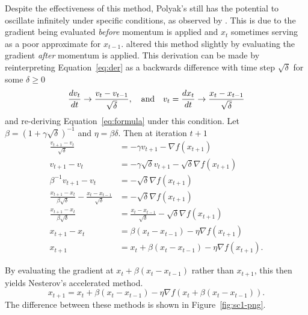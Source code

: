 Despite the effectiveness of this method, Polyak's still has the potential to
oscillate infinitely under specific conditions, as observed by
\citeauthor{lessard2016analysis}. This is due to the gradient being evaluated
\emph{before} momentum is applied and $x_t$ sometimes serving as a poor approximate
for $x_{t - 1}$. \citeauthor{nesterov1983method} altered this method slightly by
evaluating the gradient \emph{after} momentum is applied.  This derivation can
be made by reinterpreting Equation~\ref{eq:der} as a backwards difference with time
step $\sqrt\delta$ for some $\delta \geq 0$
\begin{equation}
    \label{eq:der}
    \frac{d v_t}{d t} \rightarrow \frac{v_{t} - v_{t - 1}}{\sqrt{\delta}}, \quad \text{and}
    \quad v_{t} = \frac{d x_t}{d t} \rightarrow \frac{x_{t} - x_{t - 1}}{\sqrt{\delta}}
\end{equation}
and re-deriving Equation~\ref{eq:formula} under this condition. Let $\beta =
{\left( 1 + \gamma \sqrt{\delta} \right) }^{-1}$ and $\eta = \beta \delta$. Then
at iteration $t + 1$
\begin{equation}
    \label{eq:formula}
    \begin{aligned}
        \frac{v_{t + 1} - v_{t}}{\sqrt{\delta}} &= -\gamma v_{t + 1} -\nabla
        f(x_{t + 1}) \\
        v_{t + 1} - v_{t} &= -\gamma \sqrt{\delta}v_{t + 1} -\sqrt{\delta}\nabla
        f(x_{t + 1}) \\
        \beta^{-1}v_{t + 1} - v_{t} &= -\sqrt{\delta}\nabla
        f(x_{t + 1}) \\
        \frac{x_{t + 1} - x_{t}}{\beta\sqrt{\delta}} - \frac{x_{t} - x_{t - 1}}{\sqrt{\delta}} &=  -\sqrt{\delta}\nabla
        f(x_{t + 1}) \\
        \frac{x_{t + 1} - x_{t}}{\beta\sqrt{\delta}} &= \frac{x_{t} - x_{t -
        1}}{\sqrt{\delta}} - \sqrt{\delta}\nabla f(x_{t + 1}) \\
        x_{t + 1} - x_{t} &= \beta (x_{t} - x_{t -
        1}) - \eta \nabla f(x_{t + 1}) \\
        x_{t + 1} &= x_{t} + \beta (x_{t} - x_{t -
        1}) - \eta \nabla f(x_{t + 1}).
    \end{aligned}
\end{equation}

By evaluating the gradient at $x_t + \beta(x_t - x_{t - 1})$ rather than $x_{t +
1}$, this then yields Nesterov's accelerated method.
\begin{equation}
    x_{t + 1} = x_t + \beta (x_t - x_{t - 1}) - \eta \nabla f(x_t + \beta (x_t - x_{t -
    1})).
\end{equation}
The difference between these methods is shown in
Figure~\ref{fig:sc1-png}.

